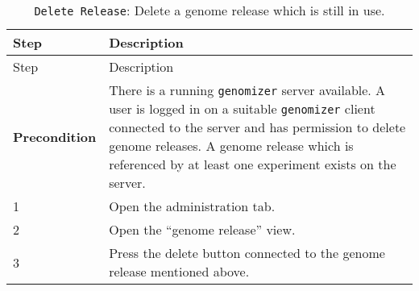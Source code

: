 \begin{longtable}[c]{@{}ll@{}}
\caption{\texttt{Delete\ Release}: Delete a genome release which is
still in use.}\tabularnewline
\toprule
\begin{minipage}[b]{0.31\columnwidth}\raggedright\strut
Step
\strut\end{minipage} &
\begin{minipage}[b]{0.63\columnwidth}\raggedright\strut
Description
\strut\end{minipage}\tabularnewline
\midrule
\endfirsthead
\toprule
\begin{minipage}[b]{0.31\columnwidth}\raggedright\strut
Step
\strut\end{minipage} &
\begin{minipage}[b]{0.63\columnwidth}\raggedright\strut
Description
\strut\end{minipage}\tabularnewline
\midrule
\endhead
\begin{minipage}[t]{0.31\columnwidth}\raggedright\strut
\textbf{Precondition}
\strut\end{minipage} &
\begin{minipage}[t]{0.63\columnwidth}\raggedright\strut
There is a running \texttt{genomizer} server available. A user is logged
in on a suitable \texttt{genomizer} client connected to the server and
has permission to delete genome releases. A genome release which is
referenced by at least one experiment exists on the server.
\strut\end{minipage}\tabularnewline
\begin{minipage}[t]{0.31\columnwidth}\raggedright\strut
1
\strut\end{minipage} &
\begin{minipage}[t]{0.63\columnwidth}\raggedright\strut
Open the administration tab.
\strut\end{minipage}\tabularnewline
\begin{minipage}[t]{0.31\columnwidth}\raggedright\strut
2
\strut\end{minipage} &
\begin{minipage}[t]{0.63\columnwidth}\raggedright\strut
Open the ``genome release'' view.
\strut\end{minipage}\tabularnewline
\begin{minipage}[t]{0.31\columnwidth}\raggedright\strut
3
\strut\end{minipage} &
\begin{minipage}[t]{0.63\columnwidth}\raggedright\strut
Press the delete button connected to the genome release mentioned above.

\end{minipage}
\end{longtable}
